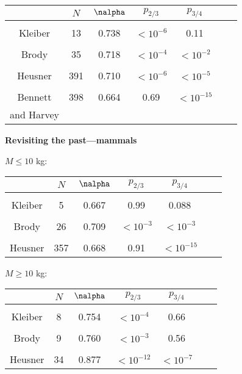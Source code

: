 {    \begin{tabular}{ccccccc}
             & $N$ & $\nalpha$ & $p_{2/3}$ & $p_{3/4}$ \\ \hline
              & & & & & & \\
      Kleiber             &  13 & 0.738 & $<10^{-6}$ & 0.11 \\
              & & & & & & \\
      Brody               &  35 & 0.718 & $<10^{-4}$ & $<10^{-2}$ \\
              & & & & & & \\
      Heusner             & 391 & 0.710 & $<10^{-6}$ & $<10^{-5}$ \\
              & & & & & & \\
      Bennett   & 398 & 0.664 & 0.69 &     $<10^{-15}$ \\
      and Harvey & & & & & & \\
    \end{tabular}


  \textbf{Revisiting the past---mammals}

  $M \leq 10$ kg:
   \begin{tabular}{ccccccc}
              & $N$ & $\nalpha$ & $p_{2/3}$ & $p_{3/4}$ \\ \hline
              & & & & & & \\
      Kleiber        &   5 & 0.667 &  0.99 & 0.088 \\
              & & & & & & \\
      Brody          &  26 & 0.709   & $<10^{-3}$ & $<10^{-3}$ \\
              & & & & & & \\
      Heusner        & 357 & 0.668 &   0.91 &   $<10^{-15}$ \\
    \end{tabular}



  $M \geq 10$ kg:
   \begin{tabular}{ccccccc}
              & $N$ & $\nalpha$ &  $p_{2/3}$ & $p_{3/4}$ \\ \hline
              & & & & & & \\
      Kleiber        &   8 & 0.754 & $<10^{-4}$ & 0.66 \\
              & & & & & & \\
      Brody          &   9 & 0.760 & $<10^{-3}$ & 0.56 \\
              & & & & & & \\
      Heusner        &  34 & 0.877 & $< 10^{-12}$ & $<10^{-7}$ \\
    \end{tabular}




}
